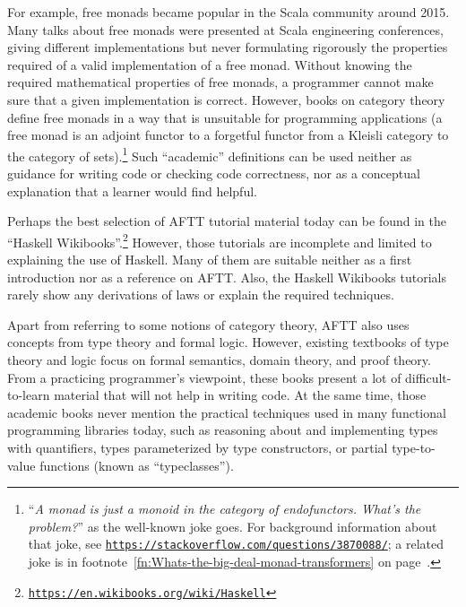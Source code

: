 For example, free monads became popular in the Scala community around
2015. Many talks about free monads were presented at Scala engineering
conferences, giving different implementations but never formulating
rigorously the properties required of a valid implementation of a
free monad. Without knowing the required mathematical properties of
free monads, a programmer cannot make sure that a given implementation
is correct. However, books on category theory define free monads in
a way that is unsuitable for programming applications (a free monad
is an adjoint functor to a forgetful functor from a Kleisli category
to the category of sets).\footnote{\textsf{``}\emph{A monad is just a monoid in the category of endofunctors.
What\textsf{'}s the problem?}\textsf{''} as the well-known joke goes.\label{fn:A-monad-is-a-monoid-in-category-of-endofunctors-big-deal}
For background information about that joke, see \texttt{\href{https://stackoverflow.com/questions/3870088/}{https://stackoverflow.com/questions/3870088/}};
a related joke is in footnote~\ref{fn:Whats-the-big-deal-monad-transformers}
on page~\pageref{fn:Whats-the-big-deal-monad-transformers}.} Such \textsf{``}academic\textsf{''} definitions can be used neither as guidance for
writing code or checking code correctness, nor as a conceptual explanation
that a learner would find helpful.

Perhaps the best selection of AFTT tutorial material today can be
found in the \textsf{``}Haskell Wikibooks\textsf{''}.\footnote{\texttt{\href{https://en.wikibooks.org/wiki/Haskell}{https://en.wikibooks.org/wiki/Haskell}}}
However, those tutorials are incomplete and limited to explaining
the use of Haskell. Many of them are suitable neither as a first introduction
nor as a reference on AFTT. Also, the Haskell Wikibooks tutorials
rarely show any derivations of laws or explain the required techniques.

Apart from referring to some notions of category theory, AFTT also
uses concepts from type theory and formal logic. However, existing
textbooks of type theory and logic focus on formal semantics, domain
theory, and proof theory. From a practicing programmer\textsf{'}s viewpoint,
these books present a lot of difficult-to-learn material that will
not help in writing code. At the same time, those academic books never
mention the practical techniques used in many functional programming
libraries today, such as reasoning about and implementing types with
quantifiers, types parameterized by type constructors, or partial
type-to-value functions (known as \textsf{``}typeclasses\textsf{''}).

